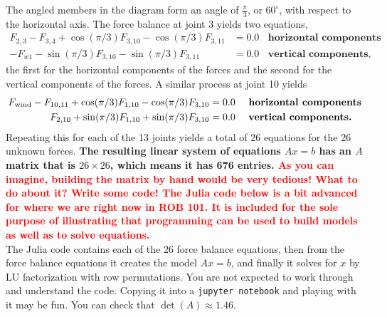 The angled members in the diagram form an angle of $\frac{\pi}{3}$, or $60^\circ$, with respect to the horizontal axis. The force balance at joint 3 yields two equations,
\begin{equation}
    \begin{aligned}
    F_{2,3}-F_{3,4}+\cos(\pi/3) F_{3,10}-\cos(\pi/3) F_{3,11} &=0.0~~~~ \textbf{horizontal components}\\
  -F_{w1}-\sin(\pi/3) F_{3,10}-\sin(\pi/3) F_{3,11}  & = 0.0~~~~ \textbf{vertical components,}
    \end{aligned}
\end{equation}
the first for the horizontal components of the forces and the second for the vertical components of the forces. A similar process at joint 10 yields
\begin{equation}
    \begin{aligned}
    F_{\rm wind}-F_{10,11}+\cos(\pi/3) F_{1,10}-\cos(\pi/3) F_{3,10} &=0.0~~~~ \textbf{horizontal components}\\
  F_{2,10}+\sin(\pi/3) F_{1,10}+\sin(\pi/3) F_{3,10}  & = 0.0~~~~ \textbf{vertical components.}
    \end{aligned}
\end{equation}
Repeating this for each of the 13 joints yields a total of 26 equations for the 26 unknown forces. \textbf{The resulting linear system of equations $Ax=b$ has an $A$ matrix that is $26 \times 26$, which means it has 676 entries. \textcolor{red}{As you can imagine, building the matrix by hand would be very tedious! What to do about it? Write some code! The Julia code below is a bit advanced for where we are right now in ROB 101. It is included for the sole purpose of illustrating that programming can be used to build models as well as to solve equations.}}\\

The Julia code contains each of the 26 force balance equations, then from the force balance equations it creates the model $Ax=b$, and finally it solves for $x$ by LU factorization with row permutations. You are not expected to work through and understand the code. Copying it into a \texttt{jupyter notebook} and playing with it may be fun. You can check that $\det(A)\approx 1.46$. 


